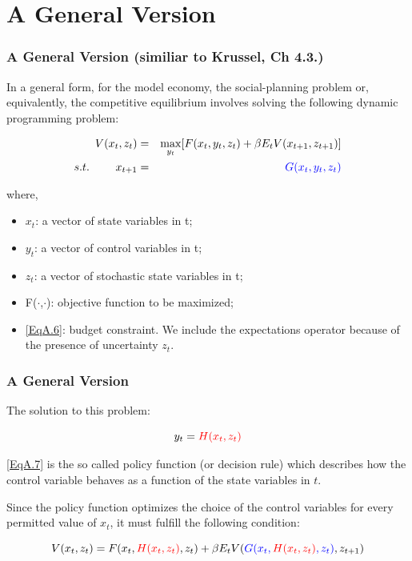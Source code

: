\documentclass[10pt, handout]{beamer}
\begin{document}
\section{A General Version}

\begin{frame}

\frametitle{A General Version (similiar to Krussel, Ch 4.3.)} \vskip 0.1in

In a general form, for the model economy, the social-planning
problem or, equivalently, the competitive equilibrium involves solving the following dynamic programming problem:

\begin{eqnarray}
V(x_{t},z_{t}) &=& \max_{y_t} [F(x_{t},y_{t},z_{t}) + \beta
E_{t}V(x_{t+1},z_{t+1})] \label{EqA.5}\\
s.t. ~~~~~~~ x_{t+1} &=& {\color{blue}G (x_{t},y_{t},z_{t})} \label{EqA.6}
\end{eqnarray}

where,\\

\begin{itemize}
\item $x_{t}$: a vector of state variables in t;
\item $y_{t}$: a vector of control variables in t;
\item $z_{t}$: a vector of stochastic state variables in t;
\item F($\cdot$,$\cdot$): objective function to be maximized;
\item \eqref{EqA.6}: budget constraint. We include the expectations operator because of the presence of uncertainty $z_t$.
\end{itemize}

\end{frame}

\begin{frame}

\frametitle{A General Version} \vskip 0.1in

The solution to this problem:

\begin{equation}\label{EqA.7}
y_{t} = {\color{red}H(x_{t}, z_{t})}
\end{equation}

\eqref{EqA.7} is the so called policy function (or decision rule)
which describes how the control variable behaves as a function of the
state variables in $t$.\vskip 0.1in

\pause

Since the policy function optimizes the choice of the control
variables for every permitted value of $x_{t}$, it must fulfill the
following condition:

\begin{equation}\label{EqA.8}
V (x_t, z_t) = F (x_t, {\color{red}H(x_t, z_t)}, z_t) + \beta E_t V({\color{blue}G(x_t, {\color{red}H(x_t,
z_t)}, z_t)}, z_{t+1})
\end{equation}

\end{frame}
\end{document}
